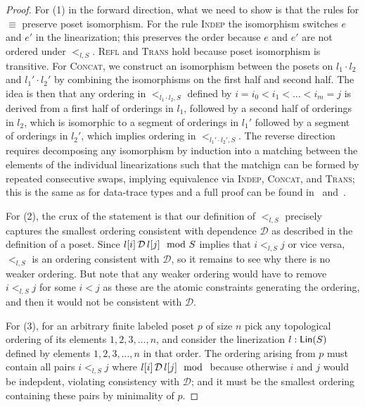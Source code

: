 \begin{proof}
For (1) in the forward direction, what we need to show is that the rules for $\equiv$ preserve poset isomorphism. For the rule \textsc{Indep} the isomorphism switches $e$ and $e'$ in the linearization; this preserves the order because $e$ and $e'$ are not ordered under $<_{l, S}$. \textsc{Refl} and \textsc{Trans} hold because poset isomorphism is transitive. For \textsc{Concat}, we construct an isomorphism between the posets on $l_1 \cdot l_2$ and $l_1' \cdot l_2'$ by combining the isomorphisms on the first half and second half. The idea is then that any ordering in $<_{l_1 \cdot l_2, S}$ defined by $i = i_0 < i_1 < \ldots < i_m = j$ is derived from a first half of orderings in $l_1$, followed by a second half of orderings in $l_2$,
which is isomorphic to a segment of orderings in $l_1'$ followed by a segment of orderings in $l_2'$, which implies ordering in $<_{l_1' \cdot l_2', S}$.
The reverse direction requires decomposing any isomorphism by induction into a matching between the elements of the individual linearizations such that the matchign can be formed by repeated consecutive swaps, implying equivalence via \textsc{Indep}, \textsc{Concat}, and \textsc{Trans}; this is the same as for data-trace types and a full proof can be found in~ and~.

For (2), the crux of the statement is that our definition of $<_{l, S}$ precisely captures the smallest ordering consistent with dependence $\mathcal{D}$ as described in the definition of a poset. Since $l[i] \,\mathcal{D}\, l[j] \mod {S}$ implies that $i <_{l, S} j$ or vice versa, $<_{l, S}$ is an ordering consistent with $\mathcal{D}$, so it remains to see why there is no weaker ordering. But note that any weaker ordering would have to remove $i <_{l, S} j$ for some $i < j$ as these are the atomic constraints generating the ordering, and then it would not be consistent with $\mathcal{D}$.

For (3), for an arbitrary finite labeled poset $p$ of size $n$ pick any topological ordering of its elements $1, 2, 3, \ldots, n$, and consider the linerization $l: \mathsf{Lin}({S})$ defined by elements $1, 2, 3, \ldots, n$ in that order. The ordering arising from $p$ must contain all pairs $i <_{l, S} j$ where $\deptype{l[i]}{l[j]}$ because otherwise $i$ and $j$ would be indepdent, violating consistency with $\mathcal{D}$; and it must be the smallest ordering containing these pairs by minimality of $p$.
\end{proof}

